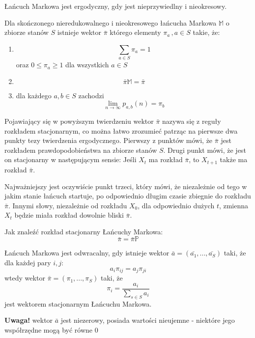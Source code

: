 \begin{definition}\label{def:ergodycznoscLM}
Łańcuch Markowa jest ergodyczny, gdy jest nieprzywiedlny i nieokresowy.
\end{definition}

\begin{theorem}\label{the:ergodycznoscLM2}%
Dla skończonego nieredukowalnego i nieokresowego łańcucha Markowa $\mathbb{M}$ o zbiorze stanów $S$ istnieje wektor $\bar{\pi}$ którego elementy $\pi _a\,,a\in S$ takie, że:
\begin{enumerate}
\item $$\sum _{a\in S} \pi _a=1$$ oraz $0\leq \pi _a\geq 1$ dla wszystkich $a\in S$
\item $$\bar{\pi}\mathbb{M}=\bar{\pi}$$
\item dla każdego $a,b\in S$ zachodzi $$\lim _{n\rightarrow \infty} p_{a,b}(n)= \pi _b$$
\end{enumerate}
Pojawiający się w powyższym twierdzeniu wektor $\bar{\pi}$ nazywa się z reguły rozkładem stacjonarnym, co można łatwo zrozumieć patrząc na pierwsze dwa punkty tezy twierdzenia ergodycznego. Pierwszy z punktów mówi, że $\bar{\pi}$ jest rozkładem prawdopodobieństwa na zbiorze stanów $S$. Drugi punkt mówi, że jest on stacjonarny w następującym sensie: Jeśli $X_t$ ma rozkład $\bar{\pi}$, to $X_{t+1}$ także ma rozkład $\bar{\pi}$.

Najważniejszy jest oczywiście punkt trzeci, który mówi, że niezależnie od tego w jakim stanie łańcuch startuje, po odpowiednio długim czasie zbiegnie do rozkładu $\bar{\pi}$. Innymi słowy, niezależnie od rozkładu $X_0$, dla odpowiednio dużych $t$, zmienna $X_t$ będzie miała rozkład dowolnie bliski $\bar{\pi}$.
\end{theorem}


\begin{problem*}
Jak znaleźć rozkład stacjonarny Łańcuchy Markowa:
$$\bar{\pi}=\bar{\pi}\mathbb{P}$$
\end{problem*}

\begin{definition}\label{def:OdwracalnoscLM}
Łańcuch Markowa jest odwracalny, gdy istnieje wektor $\bar{a}=(\bar{a_1}, ..., \bar{a_S})$ taki, że dla każdej pary $i,j$: $$a_i\pi _{ij}=a_j\pi _{ji}$$  wtedy wektor $\bar{\pi}=(\pi _1,...,\pi _S)$ taki, że $$\pi _i=\frac{a_i}{\sum _{s\in S}a_i}$$ jest wektorem stacjonarnym Łańcuchu Markowa.

\textbf{Uwaga!} wektor $\bar{a}$ jest niezerowy, posiada wartości nieujemne - niektóre jego współrzędne mogą być równe $0$
\end{definition}

